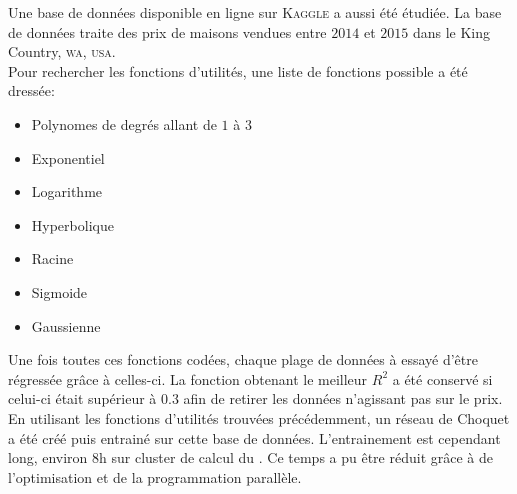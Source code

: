 Une base de données disponible en ligne sur \textsc{Kaggle} a aussi été étudiée\cite{kaggle}.
La base de données traite des prix de maisons vendues entre $2014$ et $2015$
dans le King Country, \textsc{wa}, \textsc{usa}.\\


Pour rechercher les fonctions d'utilités, une liste de fonctions possible a été dressée:
\begin{itemize}
    \item Polynomes de degrés allant de $1$ à $3$
    \item Exponentiel
    \item Logarithme
    \item Hyperbolique
    \item Racine
    \item Sigmoide
    \item Gaussienne
\end{itemize}
Une fois toutes ces fonctions codées, chaque plage de données à essayé d'être régressée grâce à celles-ci.
La fonction obtenant le meilleur $R^2$ a été conservé si celui-ci était supérieur à $0.3$ afin de retirer
les données n'agissant pas sur le prix.\\


En utilisant les fonctions d'utilités trouvées précédemment, un réseau de Choquet a été créé puis entrainé
sur cette base de données.
L'entrainement est cependant long, environ $8$h sur cluster de calcul du \lri.
Ce temps a pu être réduit grâce à de l'optimisation et de la programmation parallèle.
